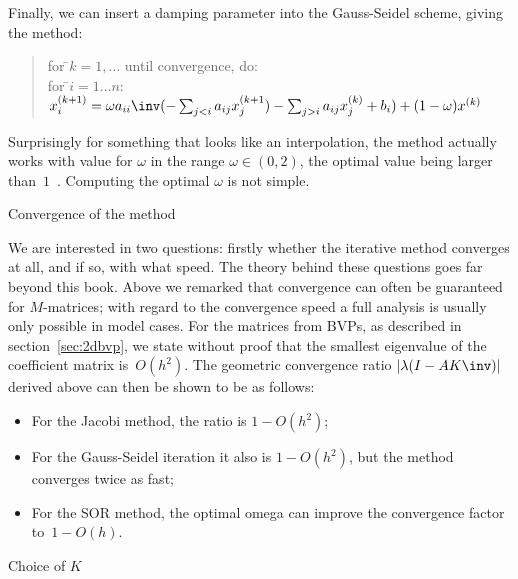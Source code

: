 Finally, we can insert a damping parameter into the Gauss-Seidel
scheme, giving the  method:
\begin{quote}
  \begin{tabbing}
    for \=$k=1,\ldots$ until convergence, do:\\
    \>for \=$i=1\ldots n$:\\
    \>\>$x^{(k+1)}_i = \omega a_{ii}\inv (-\sum_{j<i} a_{ij}x_j^{(k+1}) -
                      \sum_{j>i} a_{ij}x_j^{(k)} + b_i)
        +(1-\omega)x^{(k)}$\\
  \end{tabbing}
\end{quote}
Surprisingly for something that looks like an interpolation, the
method actually works with value for $\omega$ in the range
$\omega\in(0,2)$, the optimal value being larger
than~$1$~\cite{HaYo:applied}. Computing the optimal $\omega$ is not
simple.

 {Convergence of the method}

We are interested in two questions: firstly whether the iterative
method converges at all, and if so, with what speed.  The theory
behind these questions goes far beyond this book. Above we remarked
that convergence can often be guaranteed for $M$-matrices; with regard to
the convergence speed a full analysis is usually only possible in
model cases. For the matrices from \acp{BVP}, as described in
section~\ref{sec:2dbvp}, we state without proof that the smallest
eigenvalue of the coefficient matrix is~$O(h^2)$. The geometric
convergence ratio $|\lambda(I-AK\inv)|$ derived above can then be
shown to be as follows:
\begin{itemize}
\item For the Jacobi method, the ratio is $1-O(h^2)$;
\item For the Gauss-Seidel iteration it also is $1-O(h^2)$, but the
  method converges twice as fast;
\item For the SOR method, the optimal omega can improve the
  convergence factor to~$1-O(h)$.
\end{itemize}

 {Choice of $K$}
\label{sec:preconditioner}

